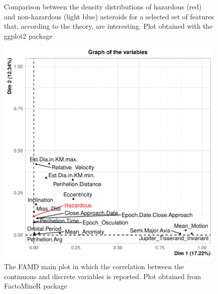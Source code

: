 \documentclass[12pt,%
               a4paper,%
               oneside,openany,%
               titlepage,%
               headinclude,footinclude,%
               BCOR5mm,%
               cleardoublepage=empty,%
               tablecaptionabove,%
               floatperchapter,
               ]{scrreprt}                 %
\begin{document}
\begin{figure}[ht]
\begin{minipage}[b]{0.5\linewidth}
    \vspace{4ex}
  \end{minipage}
\caption{Comparison between the density distributions of hazardous (red) and non-hazardous (light blue) asteroids for a selected set of features that, according to the theory, are interesting. Plot obtained with the ggplot2 package \cite{ggplot2}}
\label{Density_relevant}
\end{figure}


\begin{figure}[h]
\begin{center}
\includegraphics[width=1\textwidth]{Figures/FAMD.pdf}
\caption{The FAMD main plot in which the correlation between the continuous and discrete variables is reported. Plot obtained from FactoMineR package \cite{le2008factominer}}
\label{FADM}
\end{center}
\end{figure}
\end{document}
